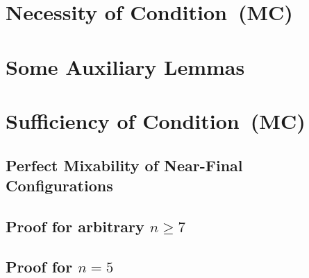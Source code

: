 \documentclass[a4paper,UKenglish]{lipics-v2018}
\begin{document}

\section{Necessity of Condition~(MC)}
\label{sec: necessity of mc}



\section{Some Auxiliary Lemmas}
\label{sec: some auxiliary lemmas}



\section{Sufficiency of Condition~(MC)}
\label{sec: sufficiency of condition mc}



\subsection{Perfect Mixability of Near-Final Configurations}
\label{subsec: near-final configurations}



\subsection{Proof for arbitrary $n \geq 7$}
\label{subsec: proof for n greater-equal than 7}



\subsection{Proof for $n=5$}
\label{subsec: proof for n equal 5}

\end{document}
